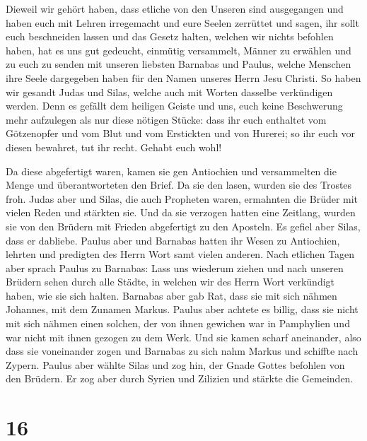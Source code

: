  Dieweil wir gehört haben, dass etliche von den Unseren
sind ausgegangen und haben euch mit Lehren irregemacht und eure Seelen
zerrüttet und sagen, ihr sollt euch beschneiden lassen und das Gesetz
halten, welchen wir nichts befohlen haben,  hat es uns
gut gedeucht, einmütig versammelt, Männer zu erwählen und zu euch zu
senden mit unseren liebsten Barnabas und Paulus,  welche
Menschen ihre Seele dargegeben haben für den Namen unseres Herrn Jesu
Christi.  So haben wir gesandt Judas und Silas, welche
auch mit Worten dasselbe verkündigen werden.  Denn es
gefällt dem heiligen Geiste und uns, euch keine Beschwerung mehr
aufzulegen als nur diese nötigen Stücke:  dass ihr euch
enthaltet vom Götzenopfer und vom Blut und vom Erstickten und von
Hurerei; so ihr euch vor diesen bewahret, tut ihr recht. Gehabt euch
wohl!

 Da diese abgefertigt waren, kamen sie gen Antiochien und
versammelten die Menge und überantworteten den Brief.  Da
sie den lasen, wurden sie des Trostes froh.  Judas aber
und Silas, die auch Propheten waren, ermahnten die Brüder mit vielen
Reden und stärkten sie.  Und da sie verzogen hatten eine
Zeitlang, wurden sie von den Brüdern mit Frieden abgefertigt zu den
Aposteln.  Es gefiel aber Silas, dass er dabliebe.
 Paulus aber und Barnabas hatten ihr Wesen zu Antiochien,
lehrten und predigten des Herrn Wort samt vielen anderen.
 Nach etlichen Tagen aber sprach Paulus zu Barnabas: Lass
uns wiederum ziehen und nach unseren Brüdern sehen durch alle Städte, in
welchen wir des Herrn Wort verkündigt haben, wie sie sich halten.
 Barnabas aber gab Rat, dass sie mit sich nähmen
Johannes, mit dem Zunamen Markus.  Paulus aber achtete es
billig, dass sie nicht mit sich nähmen einen solchen, der von ihnen
gewichen war in Pamphylien und war nicht mit ihnen gezogen zu dem Werk.
 Und sie kamen scharf aneinander, also dass sie
voneinander zogen und Barnabas zu sich nahm Markus und schiffte nach
Zypern.  Paulus aber wählte Silas und zog hin, der Gnade
Gottes befohlen von den Brüdern.  Er zog aber durch
Syrien und Zilizien und stärkte die Gemeinden.

\hypertarget{section-15}{%
\section{16}\label{section-15}}

